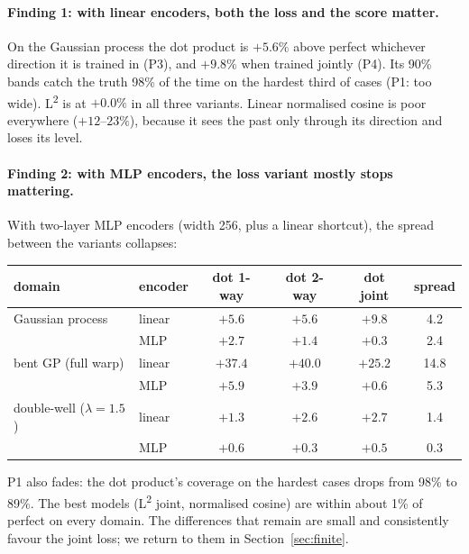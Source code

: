 \documentclass[11pt]{article}
\newcommand{\Ltwo}{L\textsuperscript{2}}
\theoremstyle{plain}
\theoremstyle{definition}
\theoremstyle{remark}
\begin{document}
\paragraph{Finding 1: with linear encoders, both the loss and the score matter.} On the
Gaussian process the dot product is $+5.6\%$ above perfect whichever direction it is trained
in (P3), and $+9.8\%$ when trained jointly (P4). Its 90\% bands catch the truth 98\% of the time
on the hardest third of cases (P1: too wide). \Ltwo{} is at $+0.0\%$ in all three
variants. Linear normalised cosine is poor everywhere ($+12$--$23\%$), because it sees the past
only through its direction and loses its level.

\paragraph{Finding 2: with MLP encoders, the loss variant mostly stops mattering.} With
two-layer MLP encoders (width 256, plus a linear shortcut), the spread between the
variants collapses:
\begin{center}\small
\begin{tabular}{@{}llcccc@{}}
\toprule
domain & encoder & dot 1-way & dot 2-way & dot joint & spread \\
\midrule
Gaussian process & linear & $+5.6$ & $+5.6$ & $+9.8$ & 4.2 \\
                 & MLP    & $+2.7$ & $+1.4$ & $+0.3$ & 2.4 \\
bent GP (full warp) & linear & $+37.4$ & $+40.0$ & $+25.2$ & 14.8 \\
                    & MLP    & $+5.9$ & $+3.9$ & $+0.6$ & 5.3 \\
double-well ($\lambda=1.5$) & linear & $+1.3$ & $+2.6$ & $+2.7$ & 1.4 \\
                    & MLP    & $+0.6$ & $+0.3$ & $+0.5$ & 0.3 \\
\bottomrule
\end{tabular}
\end{center}
P1 also fades: the dot product's coverage on the hardest cases drops from 98\% to 89\%. The
best models (\Ltwo{} joint, normalised cosine) are within about 1\% of perfect on every
domain. The differences that remain are small and consistently favour the joint loss; we
return to them in Section~\ref{sec:finite}.
\end{document}
